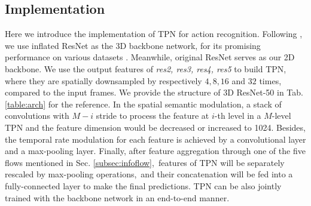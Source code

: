 \documentclass[10pt,twocolumn,letterpaper]{article}
\begin{document}
\subsection{Implementation}\label{subsec:application}
Here we introduce the implementation of TPN for action recognition.
Following \cite{slowfast}, we use inflated ResNet \cite{slowfast} as the 3D backbone network, for its promising performance on various datasets \cite{kinetics}.
Meanwhile, original ResNet \cite{resnet} serves as our 2D backbone.
We use the output features of \emph{res2, res3, res4, res5} to build TPN,
where they are spatially downsampled by respectively $4, 8, 16$ and $32$ times, compared to the input frames.
We provide the structure of 3D ResNet-50 in Tab.\ref{table:arch} for the reference.
In the spatial semantic modulation, a stack of convolutions with $M-i$ stride to process the feature at $i$-th level in a $M$-level TPN and the feature dimension would be decreased or increased to 1024.
Besides, the temporal rate modulation for each feature is achieved by a convolutional layer and a max-pooling layer.
Finally, after feature aggregation through one of the five flows mentioned in Sec. \ref{subsec:infoflow},\
features of TPN will be separately rescaled by max-pooling operations,\
and their concatenation will be fed into a fully-connected layer to make the final predictions.
TPN can be also jointly trained with the backbone network in an end-to-end manner.
\end{document}
